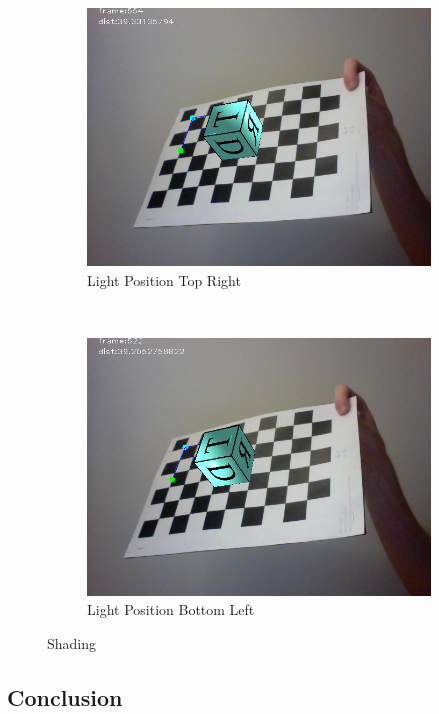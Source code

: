 \begin{figure}[h!]
\begin{subfigure}[b]{0.5\textwidth}
		\includegraphics[width=\textwidth]{final/images/extra1.png}
		\caption{Light Position Top Right}
		\label{subfig:extra1}
	\end{subfigure}
	~
	\begin{subfigure}[b]{0.5\textwidth}
		\includegraphics[width=\textwidth]{final/images/extra2.png}
		\caption{Light Position Bottom Left}
		\label{subfig:extra2}
	\end{subfigure}
	
	\label{fig:texturing}
	\caption{Shading}
\end{figure}

\subsection{Conclusion}

